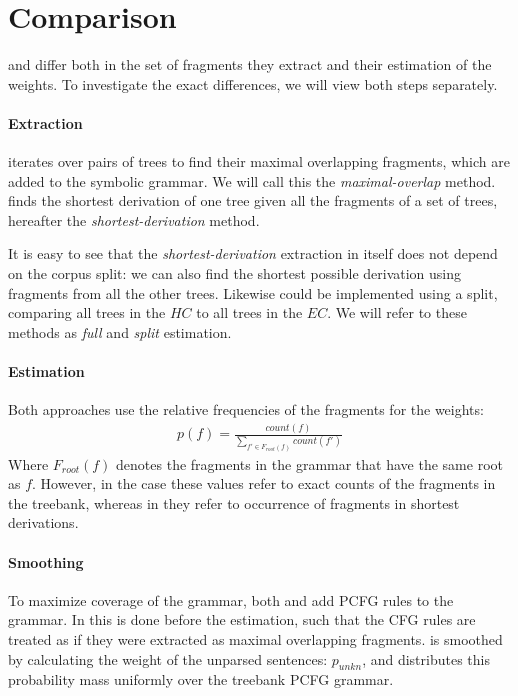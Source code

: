 
\section{Comparison} \label{sec:Comparison}
\dops{} and \ddop{} differ both in the set of fragments they extract and their estimation of the weights. To investigate the exact differences, we will view both steps separately.

\paragraph{Extraction}

\ddop{} iterates over pairs of trees to find their maximal overlapping fragments, which are added to the symbolic grammar. We will call this the \emph{maximal-overlap} method. \dops{} finds the shortest derivation of one tree given all the fragments of a set of trees, hereafter the \emph{shortest-derivation} method. 

It is easy to see that the \emph{shortest-derivation} extraction in itself does not depend on the corpus split: we can also find the shortest possible derivation using fragments from all the other trees. Likewise \ddop{} could be implemented using a split, comparing all trees in the $HC$ to all trees in the $EC$.
We will refer to these methods as \emph{full} and \emph{split} estimation.

\paragraph{Estimation}

Both approaches use the relative frequencies of the fragments for the weights:
\begin{align}p(f)=\frac{count(f)}{\sum_{f'\in F_{root}(f)} count(f')}\end{align} 
Where $F_{root}(f)$ denotes the fragments in the grammar that have the same root as $f$.
However, in the \ddop{} case these values refer to exact counts of the fragments in the treebank, whereas in \dops{} they refer to occurrence of fragments in shortest derivations.

\paragraph{Smoothing}
To maximize coverage of the grammar, both \ddop{} and \dops{} add PCFG rules to the grammar. In \ddop{} this is done before the estimation, such that the CFG rules are treated as if they were extracted as maximal overlapping fragments.
\dops{} is smoothed by calculating the weight of the unparsed sentences: $p_{unkn}$, and distributes this probability mass uniformly over the treebank PCFG grammar.





